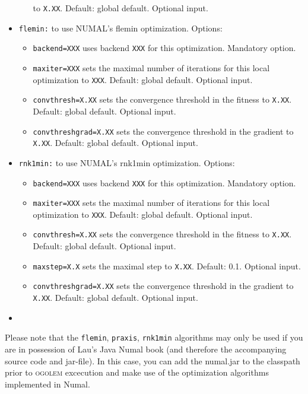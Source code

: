 \documentclass[a4paper,10pt]{scrbook}
\newcommand{\ogo}{\textsc{ogolem}}
\begin{document}
\begin{itemize}
\begin{itemize}
to \texttt{X.XX}. Default: global default. Optional input.
    \end{itemize}
  \item \texttt{flemin:} to use NUMAL's flemin optimization. Options:
    \begin{itemize}
      \item \texttt{backend=XXX} uses backend \texttt{XXX} for this 
optimization. Mandatory option.
      \item \texttt{maxiter=XXX} sets the maximal number of iterations for this 
local optimization to \texttt{XXX}. Default: global default. Optional input.
      \item \texttt{convthresh=X.XX} sets the convergence threshold in the 
fitness to \texttt{X.XX}. Default: global default. Optional input.
      \item \texttt{convthreshgrad=X.XX} sets the convergence threshold in the 
gradient to \texttt{X.XX}. Default: global default. Optional input.
    \end{itemize}
  \item \texttt{rnk1min:} to use NUMAL's rnk1min optimization. Options:
    \begin{itemize}
      \item \texttt{backend=XXX} uses backend \texttt{XXX} for this 
optimization. Mandatory option.
      \item \texttt{maxiter=XXX} sets the maximal number of iterations for this 
local optimization to \texttt{XXX}. Default: global default. Optional input.
      \item \texttt{convthresh=X.XX} sets the convergence threshold in the 
fitness to \texttt{X.XX}. Default: global default. Optional input.
      \item \texttt{maxstep=X.X} sets the maximal step to \texttt{X.XX}. 
Default: 0.1. Optional input.
      \item \texttt{convthreshgrad=X.XX} sets the convergence threshold in the 
gradient to \texttt{X.XX}. Default: global default. Optional input.
    \end{itemize}

\end{itemize}

    \begin{itemize}
      \item 
    \end{itemize}


Please note that the \texttt{flemin}, \texttt{praxis}, \texttt{rnk1min} 
algorithms may only be used if you are in possession of Lau's Java Numal 
book\cite{javanumalbook} (and 
therefore the accompanying source code and jar-file). In this case, you can add 
the numal.jar to the classpath prior 
to \ogo{} excecution and make use of the optimization algorithms implemented in 
Numal.
\end{document}
